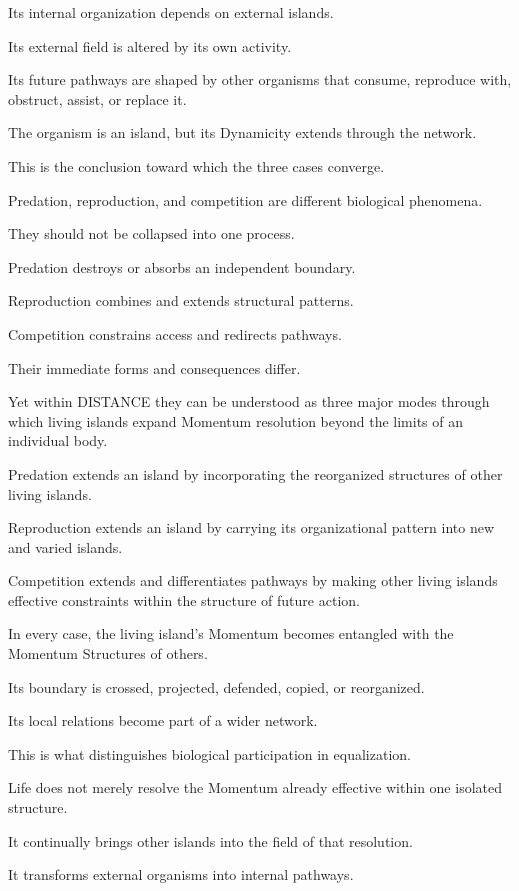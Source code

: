 Its internal organization depends on external islands.

Its external field is altered by its own activity.

Its future pathways are shaped by other organisms that consume, reproduce with, obstruct, assist, or replace it.

The organism is an island, but its Dynamicity extends through the network.

This is the conclusion toward which the three cases converge.

Predation, reproduction, and competition are different biological phenomena.

They should not be collapsed into one process.

Predation destroys or absorbs an independent boundary.

Reproduction combines and extends structural patterns.

Competition constrains access and redirects pathways.

Their immediate forms and consequences differ.

Yet within DISTANCE they can be understood as three major modes through which living islands expand Momentum resolution beyond the limits of an individual body.

Predation extends an island by incorporating the reorganized structures of other living islands.

Reproduction extends an island by carrying its organizational pattern into new and varied islands.

Competition extends and differentiates pathways by making other living islands effective constraints within the structure of future action.

In every case, the living island’s Momentum becomes entangled with the Momentum Structures of others.

Its boundary is crossed, projected, defended, copied, or reorganized.

Its local relations become part of a wider network.

This is what distinguishes biological participation in equalization.

Life does not merely resolve the Momentum already effective within one isolated structure.

It continually brings other islands into the field of that resolution.

It transforms external organisms into internal pathways.

